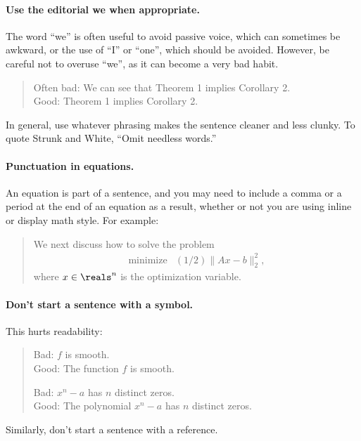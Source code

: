 \documentclass[12pt]{article}
\begin{document}
\paragraph{Use the editorial we when appropriate.}
The word ``we'' is often useful to avoid passive voice, which can
sometimes be awkward, or the use of ``I'' or
``one'', which should be avoided. However, be careful not to overuse
``we'', as it can become a very bad habit.
\begin{quote}
Often bad: We can see that Theorem 1 implies Corollary 2.\\
Good: Theorem 1 implies Corollary 2.
\end{quote}
In general, use whatever phrasing makes the sentence cleaner and less clunky.
To quote Strunk and White, ``Omit needless words.''

\paragraph{Punctuation in equations.}
An equation is part of a sentence, and you may need to include a comma or a period
at the end of an equation as a result, whether or not you are using inline or
display math style. For example:
\begin{quote}
    We next discuss how to solve the problem
    \[
        \begin{array}{ll}
            \mbox{minimize} & (1/2)\|Ax - b\|_2^2,
        \end{array}
    \]
    where $x \in \reals^n$ is the optimization variable.
\end{quote}

\paragraph{Don't start a sentence with a symbol.}
This hurts readability:
\begin{quote}
Bad: $f$ is smooth.\\
Good: The function $f$ is smooth.

Bad: $x^n - a$ has $n$ distinct zeros. \\
Good: The polynomial $x^n - a$ has $n$ distinct zeros.
\end{quote}
Similarly, don't start a sentence with a reference.
\end{document}
